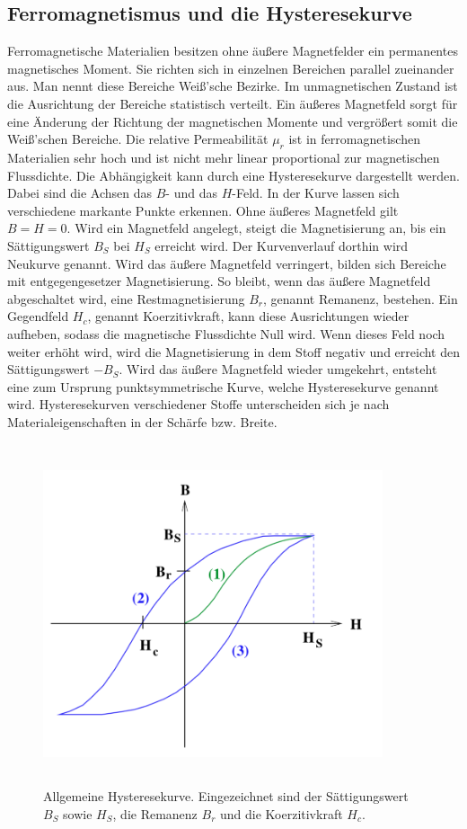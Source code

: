 \subsection{Ferromagnetismus und die Hysteresekurve}
Ferromagnetische Materialien besitzen ohne äußere Magnetfelder ein permanentes 
magnetisches Moment. Sie richten sich in einzelnen Bereichen parallel zueinander aus. 
Man nennt diese Bereiche Weiß'sche Bezirke. Im unmagnetischen Zustand ist die 
Ausrichtung der Bereiche statistisch verteilt. Ein äußeres Magnetfeld sorgt für eine 
Änderung der Richtung der magnetischen Momente und vergrößert somit die Weiß'schen 
Bereiche. 
\newline
Die relative Permeabilität $\mu_{r}$ ist in ferromagnetischen Materialien sehr hoch 
und ist nicht mehr linear proportional zur magnetischen Flussdichte. 
Die Abhängigkeit kann durch eine Hysteresekurve dargestellt werden.
Dabei sind die Achsen das $B$- und das $H$-Feld.
In der Kurve lassen sich verschiedene markante Punkte erkennen. 
Ohne äußeres Magnetfeld gilt $B = H = 0$. Wird ein Magnetfeld angelegt, steigt die 
Magnetisierung an, bis ein Sättigungswert $B_{S}$ bei $H_{S}$ erreicht wird. Der 
Kurvenverlauf dorthin wird Neukurve genannt. 
Wird das äußere Magnetfeld verringert, bilden sich Bereiche mit entgegengesetzer 
Magnetisierung. So bleibt, wenn das äußere Magnetfeld abgeschaltet wird, eine 
Restmagnetisierung $B_{r}$, genannt Remanenz, bestehen. 
Ein Gegendfeld $H_{c}$, genannt Koerzitivkraft, kann diese Ausrichtungen wieder 
aufheben, sodass die magnetische Flussdichte Null wird. Wenn dieses Feld noch weiter 
erhöht wird, wird die Magnetisierung %
in dem Stoff negativ und erreicht den Sättigungswert $-B_{S}$. Wird das äußere 
Magnetfeld wieder umgekehrt, entsteht eine zum Ursprung punktsymmetrische Kurve, welche
Hysteresekurve genannt wird. Hysteresekurven verschiedener Stoffe unterscheiden sich je
nach Materialeigenschaften in der Schärfe bzw. Breite. 
\begin{figure}
    \centering
    \includegraphics[width=10cm,height=10cm]{build/Hysteresekurve.png}
    \caption{Allgemeine Hysteresekurve. Eingezeichnet sind der Sättigungswert $B_{S}$
    sowie $H_{S}$, die Remanenz $B_{r}$ und die Koerzitivkraft $H_{c}$.}
\end{figure}
